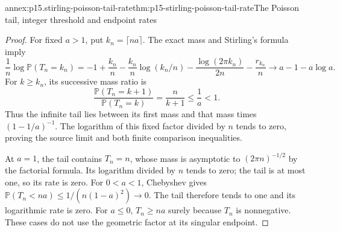 \begin{annexitem}{annex:p15.stirling-poisson-tail-rate}{thm:p15-stirling-poisson-tail-rate}{The Poisson tail, integer threshold and endpoint rates}
\begin{proof}
For fixed \(a>1\), put \(k_n=\lceil na\rceil\).
The exact mass and Stirling's formula imply
\[
 \frac1n\log\mathbb P(T_n=k_n)
 =-1+\frac{k_n}{n}
       -\frac{k_n}{n}\log(k_n/n)
       -\frac{\log(2\pi k_n)}{2n}-\frac{r_{k_n}}n
 \longrightarrow a-1-a\log a.
\]
For \(k\geq k_n\), its successive mass ratio is
\[
 \frac{\mathbb P(T_n=k+1)}{\mathbb P(T_n=k)}
       =\frac{n}{k+1}\leq\frac1a<1.
\]
Thus the infinite tail lies between its first mass and
that mass times \((1-1/a)^{-1}\).
The logarithm of this fixed factor divided by \(n\)
tends to zero, proving the source limit and both finite
comparison inequalities.

At \(a=1\), the tail contains \(T_n=n\), whose mass is
asymptotic to \((2\pi n)^{-1/2}\) by the factorial formula.
Its logarithm divided by \(n\) tends to zero; the tail
is at most one, so its rate is zero.
For \(0<a<1\), Chebyshev gives
\(\mathbb P(T_n<na)\leq1/(n(1-a)^2)\to0\).
The tail therefore tends to one and its logarithmic
rate is zero. For \(a\leq0\), \(T_n\geq na\) surely
because \(T_n\) is nonnegative. These cases do not use
the geometric factor at its singular endpoint.
\end{proof}
\end{annexitem}

